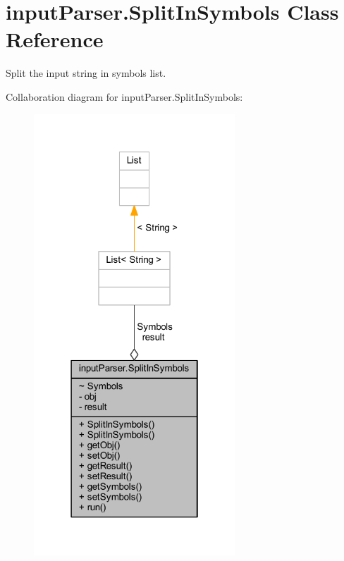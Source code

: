 \hypertarget{classinput_parser_1_1_split_in_symbols}{\section{input\-Parser.\-Split\-In\-Symbols Class Reference}
\label{classinput_parser_1_1_split_in_symbols}
}


Split the input string in symbols list.  




Collaboration diagram for input\-Parser.\-Split\-In\-Symbols\-:\nopagebreak
\begin{figure}[H]
\begin{center}
\leavevmode
\includegraphics[width=214pt]{classinput_parser_1_1_split_in_symbols__coll__graph}
\end{center}
\end{figure}
